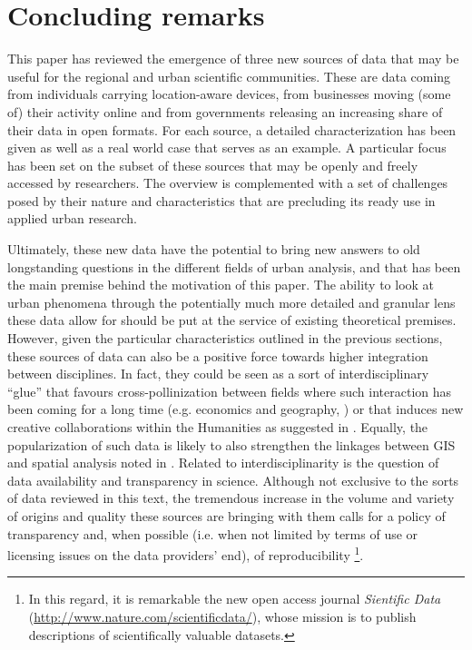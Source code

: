 \documentclass[12pt]{article}
\begin{document}
\section{Concluding remarks}
\label{conclusions}
This paper has reviewed the emergence of three new sources of data that
may be useful for the regional and urban scientific communities. These are
data coming from individuals carrying location-aware devices, from businesses
moving (some of) their activity online and from governments releasing
an increasing share of
their data in open formats. For each source, a detailed characterization has
been given as well as a real world case that serves as an example. A
particular focus has been set on the subset of these sources that may be openly and freely
accessed by researchers. The overview is complemented with a set of challenges
posed by their nature and characteristics that are precluding its ready use in
applied urban research.
 
Ultimately, these new data have the potential to bring new answers to old
longstanding questions in the different fields of urban analysis, and that has
been the main premise behind the motivation of this paper.
%
The ability to look at urban phenomena through the potentially much more
detailed and granular lens these data allow for should be put at the service
of existing theoretical premises.
However, given the particular characteristics outlined in the previous
sections, these sources of data can also be a positive force towards higher
integration between disciplines. In fact, they could be seen as a sort
of interdisciplinary ``glue'' that favours
cross-pollinization between fields where such interaction has been coming for a long
time (e.g. economics and geography, \citealp{Rodrguez-Pose01032011}) or that
induces new creative collaborations within the Humanities as suggested in
\cite{delyserSui2012phg}.
%
Equally, the popularization of such data is likely to also
strengthen the linkages between GIS and spatial analysis noted in
\cite{goodchildHaining2004}.
Related to interdisciplinarity is the question of data
availability and transparency in science. Although not exclusive to the sorts of data
reviewed in this text, the tremendous increase in the volume and variety of
origins and quality these sources are bringing with them calls for a policy of
transparency and, when possible (i.e. when not
limited by terms of use or licensing issues on the data providers' end), of
reproducibility \citep{peng2011science}\footnote{In this regard, it is
remarkable the new open access journal \emph{Sientific Data}
(\url{http://www.nature.com/scientificdata/}), whose mission is to publish
descriptions of scientifically valuable datasets.}.
\end{document}
